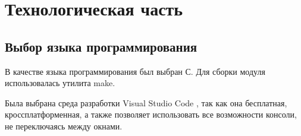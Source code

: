 \section{Технологическая часть}

\subsection{Выбор языка программирования}
В качестве языка программирования был выбран С. \cite{c} Для сборки модуля использовалась утилита make.

Была выбрана среда разработки Visual Studio Code \cite{VStudio}, так как она бесплатная, кроссплатформенная,  а также позволяет использовать все возможности консоли, не переключаясь между окнами. \newline

